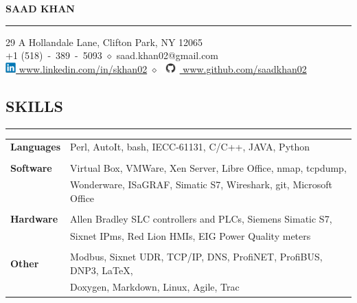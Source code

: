 \documentclass{article}
\begin{document}
%
\begin{center}
    {\MakeUppercase{\huge\bf Saad Khan}} \\
    \bigskip
    \hrule
    \bigskip
    29 A Hollandale Lane, Clifton Park, NY 12065 \\
    +1 (518)~-~389~-~5093
    $\diamond$
    saad.khan02@gmail.com
    \\
    \href{https://www.linkedin.com/in/skhan02}
         {\includegraphics[width=4mm]{linkedin.png} www.linkedin.com/in/skhan02}
    $\diamond$
    \href{https://www.github.com/saadkhan02}
         {\includegraphics[width=7mm]{github.png} www.github.com/saadkhan02}
    \\
    \bigskip
\end{center}

%
\subsection*{\MakeUppercase{\bf Skills}}
    \hrule
    \bigskip
    \begin{tabular}{l l}
    {\bfseries Languages} &
    Perl, AutoIt, bash, IECC-61131, C/C++, JAVA, Python \\
    \\
    {\bfseries Software} &
    Virtual Box, VMWare, Xen Server, Libre Office, nmap, tcpdump, \\
    &
    Wonderware, ISaGRAF, Simatic S7, Wireshark, git, Microsoft Office \\
    \\
    {\bfseries Hardware} &
    Allen Bradley SLC controllers and PLCs, Siemens Simatic S7, \\
    &
    Sixnet IPms, Red Lion HMIs, EIG Power Quality meters \\
    \\
    {\bfseries Other} &
    Modbus, Sixnet UDR, TCP/IP, DNS, ProfiNET, ProfiBUS, DNP3, \LaTeX, \\
    &
    Doxygen, Markdown, Linux, Agile, Trac \\
    \end{tabular}
    \bigskip

%
\end{document}
